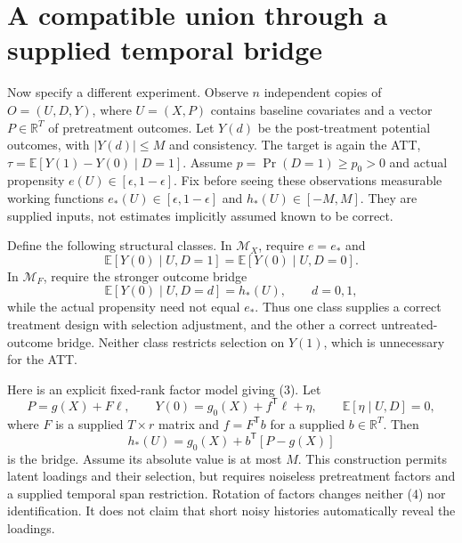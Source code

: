 \documentclass[11pt]{article}
\theoremstyle{remark}
\newcommand{\E}{\mathbb E}
\newcommand{\R}{\mathbb R}
\begin{document}
\section{A compatible union through a supplied temporal bridge}
Now specify a different experiment. Observe $n$ independent copies of
$O=(U,D,Y)$, where $U=(X,P)$ contains baseline covariates and a vector
$P\in\R^T$ of pretreatment outcomes. Let $Y(d)$ be the post-treatment
potential outcomes, with $|Y(d)|\leq M$ and consistency. The target is
again the ATT, $\tau=\E[Y(1)-Y(0)\mid D=1]$.
Assume $p=\Pr(D=1)\geq p_0>0$ and actual propensity
$e(U)\in[\epsilon,1-\epsilon]$. Fix before seeing these observations
measurable working functions $e_*(U)\in[\epsilon,1-\epsilon]$ and
$h_*(U)\in[-M,M]$. They are supplied inputs, not estimates implicitly
assumed known to be correct.

Define the following structural classes. In $\mathcal M_X$, require
$e=e_*$ and
\[
 \E[Y(0)\mid U,D=1]=\E[Y(0)\mid U,D=0]. \tag{2}
\]
In $\mathcal M_F$, require the stronger outcome bridge
\[
 \E[Y(0)\mid U,D=d]=h_*(U),\qquad d=0,1, \tag{3}
\]
while the actual propensity need not equal $e_*$. Thus one class supplies
a correct treatment design with selection adjustment, and the other a
correct untreated-outcome bridge. Neither class restricts selection on
$Y(1)$, which is unnecessary for the ATT.

Here is an explicit fixed-rank factor model giving (3). Let
\[
 P=g(X)+F\ell,\qquad
 Y(0)=g_0(X)+f^\mathsf T\ell+\eta,
 \qquad\E[\eta\mid U,D]=0,
\]
where $F$ is a supplied $T\times r$ matrix and
$f=F^\mathsf Tb$ for a supplied $b\in\R^T$. Then
\[
 h_*(U)=g_0(X)+b^\mathsf T[P-g(X)] \tag{4}
\]
is the bridge. Assume its absolute value is at most $M$.
This construction permits latent loadings and their selection, but requires
noiseless pretreatment factors and a supplied temporal span restriction.
Rotation of factors changes neither (4) nor identification. It does not
claim that short noisy histories automatically reveal the loadings.
\end{document}
